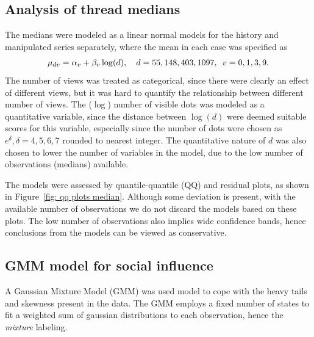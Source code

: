 \documentclass[9pt,a4paper,twocolumn,lineno]{article}
\begin{document}
\subsection*{Analysis of thread medians}
The medians were modeled as a linear normal models for the history and manipulated series separately, where the mean in each case was specified as
\begin{align*}
	\mu_{dv} = \alpha_v+\beta_v\log(d), \quad d=55, 148, 403, 1097, \enskip v=0,1,3,9 .
\end{align*}
The number of views was treated as categorical, since there were clearly an effect of different views, but it was hard to quantify the relationship between different number of views. The ($\log$) number of visible dots was modeled as a quantitative variable, since the distance between $\log(d)$ were deemed suitable scores for this variable, especially since the number of dots were chosen as $e^{\delta}, \delta=4,5,6,7$ rounded to nearest integer. The quantitative nature of $d$ was also chosen to lower the number of variables in the model, due to the low number of observations (medians) available. 

The models were assessed by quantile-quantile (QQ) and residual plots, as shown in Figure~\ref{fig: qq plots median}. Although some deviation is present, with the available number of observations we do not discard the models based on these plots. The low number of observations also implies wide confidence bands, hence conclusions from the models can be viewed as conservative. 

\subsection*{GMM model for social influence}
A Gaussian Mixture Model (GMM) was used model to cope with the heavy tails and skewness present in the data. The GMM employs a fixed number of states to fit a weighted sum of gaussian distributions to each observation, hence the \emph{mixture} labeling.
\end{document}
